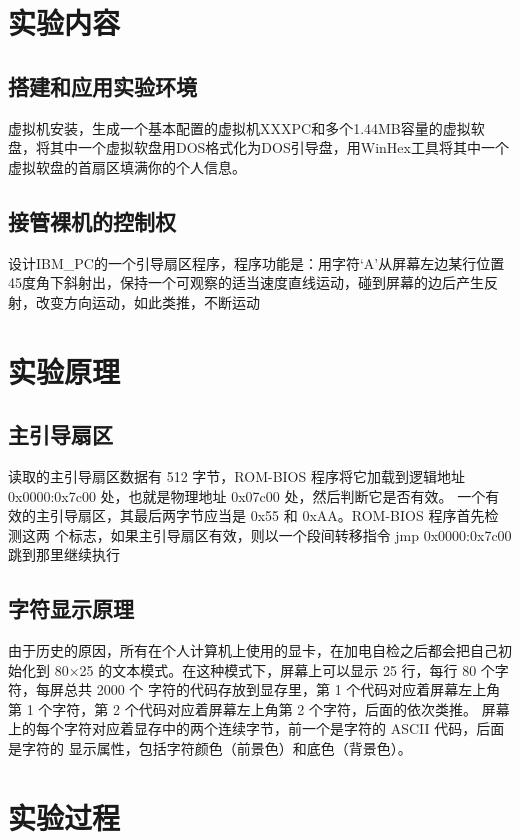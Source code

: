 \documentclass[a4paper, 11pt]{article} %
\begin{document}
\section{实验内容}

\subsection{搭建和应用实验环境}
虚拟机安装，生成一个基本配置的虚拟机XXXPC和多个1.44MB容量的虚拟软盘，将其中一个虚拟软盘用DOS格式化为DOS引导盘，用WinHex工具将其中一个虚拟软盘的首扇区填满你的个人信息。

\subsection{接管裸机的控制权}

设计IBM\_PC的一个引导扇区程序，程序功能是：用字符‘A’从屏幕左边某行位置45度角下斜射出，保持一个可观察的适当速度直线运动，碰到屏幕的边后产生反射，改变方向运动，如此类推，不断运动

\section{实验原理}
\subsection{主引导扇区}
读取的主引导扇区数据有 512 字节，ROM-BIOS 程序将它加载到逻辑地址 0x0000:0x7c00
处，也就是物理地址 0x07c00 处，然后判断它是否有效。
一个有效的主引导扇区，其最后两字节应当是 0x55 和 0xAA。ROM-BIOS 程序首先检测这两
个标志，如果主引导扇区有效，则以一个段间转移指令 jmp 0x0000:0x7c00 跳到那里继续执行 \cite{assembly}
\subsection{字符显示原理}
由于历史的原因，所有在个人计算机上使用的显卡，在加电自检之后都会把自己初始化到
80×25 的文本模式。在这种模式下，屏幕上可以显示 25 行，每行 80 个字符，每屏总共 2000 个
字符的代码存放到显存里，第 1 个代码对应着屏幕左上角第 1 个字符，第 2 个代码对应着屏幕左上角第 2 个字符，后面的依次类推。
屏幕上的每个字符对应着显存中的两个连续字节，前一个是字符的 ASCII 代码，后面是字符的
显示属性，包括字符颜色（前景色）和底色（背景色）。\cite{assembly}

\section{实验过程}
\end{document}
